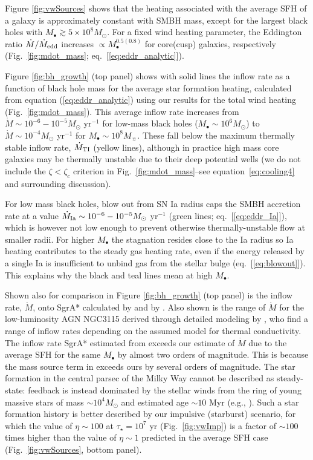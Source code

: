 \documentclass[usenatbib,fleqn]{mn2e}
\begin{document}
Figure \ref{fig:vwSources} shows that the heating associated with the
average SFH of a galaxy is approximately constant
with SMBH mass, except for the largest black holes with $M_{\bullet}
\gtrsim 5\times 10^{8}M_{\odot}$.  For a fixed wind heating parameter,
the Eddington ratio $\dot{M}/\dot{M}_{\rm edd}$ increases $\propto
M_{\bullet}^{0.5(0.8)}$ for core(cusp) galaxies, respectively
(Fig.~\ref{fig:mdot_mass}; eq.~[\ref{eq:eddr_analytic}]).

Figure \ref{fig:bh_growth} (top panel) shows with solid lines the
inflow rate as a function of black hole mass for the average star
formation heating, calculated from equation (\ref{eq:eddr_analytic})
using our results for the total wind heating
(Fig.~\ref{fig:mdot_mass}).  This average inflow rate increases
from $\dot{M} \sim 10^{-6}-10^{-5}M_{\odot}$ yr$^{-1}$ for low-mass
black holes ($M_{\bullet} \sim 10^{6}M_{\odot}$) to $\dot{M} \sim
10^{-4}M_{\odot}$ yr$^{-1}$ for $M_{\bullet} \sim 10^{8}M_{\sun}$.
These fall below the maximum thermally stable inflow rate,
$\dot{M}_{\rm TI}$ (yellow lines), although in practice high mass core
galaxies may be thermally unstable due to their deep potential wells
(we do not include the $\zeta<\zeta_c$ criterion in
Fig.~\ref{fig:mdot_mass}--see equation~\eqref{eq:cooling4} and
surrounding discussion).


For low mass black holes, blow out from SN Ia radius caps the SMBH
accretion rate at a value $\dot{M}_{\rm Ia} \sim
10^{-6}-10^{-5}M_{\odot}$ yr$^{-1}$ (green lines;
eq.~[\ref{eq:eddr_Ia}]), which is however not low enough to prevent
otherwise thermally-unstable flow at smaller radii.  For higher
$M_{\bullet}$ the stagnation resides close to the Ia radius so Ia
heating contributes to the steady gas heating rate, even if the energy
released by a single Ia is insufficient to unbind gas from the stellar
bulge (eq.~[\ref{eq:blowout}]).  This explains why the black and teal
lines mean at high $M_{\bullet}$.

Shown also for comparison in Figure \ref{fig:bh_growth} (top panel) is
the inflow rate, $\dot{M}$, onto SgrA* calculated by
\citet{Quataert:2004a} and by \citet{Cuadra+2008}.  Also shown is the
range of $\dot{M}$ for the low-luminosity AGN NGC3115 derived through
detailed modeling by \citet{ShcherbakovWong+:2014a}, who find a range
of inflow rates depending on the assumed model for thermal
conductivity.  The inflow rate SgrA* estimated from
\citet{Quataert:2004a} exceeds our estimate of $\dot{M}$ due to the
average SFH for the same $M_{\bullet}$ by almost two orders of
magnitude. This is because the mass source term in
\citet{Quataert:2004a} exceeds ours by several orders of magnitude.
The star formation in the central parsec of the Milky Way cannot be
described as steady-state: feedback is instead dominated by the
stellar winds from the ring of young massive stars of mass $\sim
10^{4}M_{\odot}$ and estimated age $\sim 10$ Myr (e.g.,
\citealt{Schodel+07}).  Such a star formation history is better
described by our impulsive (starburst) scenario, for which the value
of $\eta \sim 100$ at $\tau_{\star} = 10^{7}$ yr
(Fig.~\ref{fig:vwImp}) is a factor of $\sim 100$ times higher than the
value of $\eta \sim 1$ predicted in the average SFH case
(Fig.~\ref{fig:vwSources}, bottom panel). 
\end{document}
